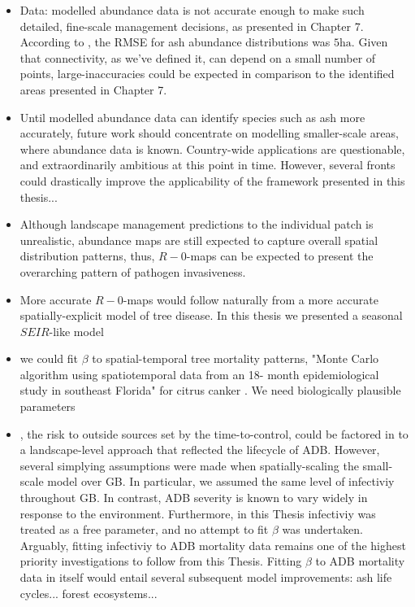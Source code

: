 \begin{itemize}
    \item Data: modelled abundance data is not accurate enough to make such detailed, fine-scale management decisions, as presented in Chapter 7. According to \cite{hill.data},
    the RMSE for ash abundance distributions was $5\mathrm{ha}$. Given that connectivity, as we've defined it, can depend on a small number of points,
    large-inaccuracies could be expected in comparison to the identified areas presented in Chapter 7.
    \item Until modelled abundance data can identify species such as ash more accurately, future work should concentrate on modelling smaller-scale areas, 
    where abundance data is known. Country-wide applications are questionable, and extraordinarily ambitious at this point in time. However, several fronts could drastically improve the applicability of the framework presented in this thesis...
    \item Although landscape management predictions to the individual patch is unrealistic, abundance maps are still expected to capture overall spatial distribution patterns,
    thus, $R-0$-maps can be expected to present the overarching pattern of pathogen invasiveness.
    \item More accurate $R-0$-maps would follow naturally from a more accurate spatially-explicit model of tree disease. In this thesis we presented a seasonal $SEIR$-like model \cite{gottwald2002geo}
    \item we could fit $\beta$ to spatial-temporal tree mortality patterns, "Monte Carlo algorithm using spatiotemporal data from an 18- month epidemiological study in southeast Florida" for citrus canker \cite{neri2014bayesian}. We need biologically plausible parameters
    \item \cite{WEBIDEMICS}, the risk to outside sources set by the time-to-control, could be factored in to a landscape-level approach
    that reflected the lifecycle of ADB. However, several simplying assumptions were made when spatially-scaling the small-scale model over GB.
    In particular, we assumed the same level of infectiviy throughout GB. In contrast, ADB severity is known to vary widely in response to the environment.
    Furthermore, in this Thesis infectiviy was treated as a free parameter, and no attempt to fit $\beta$ was undertaken.
    Arguably, fitting infectiviy to ADB mortality data remains one of the highest priority investigations to follow from this Thesis.
    Fitting $\beta$ to ADB mortality data in itself would entail several subsequent model improvements: ash life cycles... forest ecosystems...

\end{itemize}
